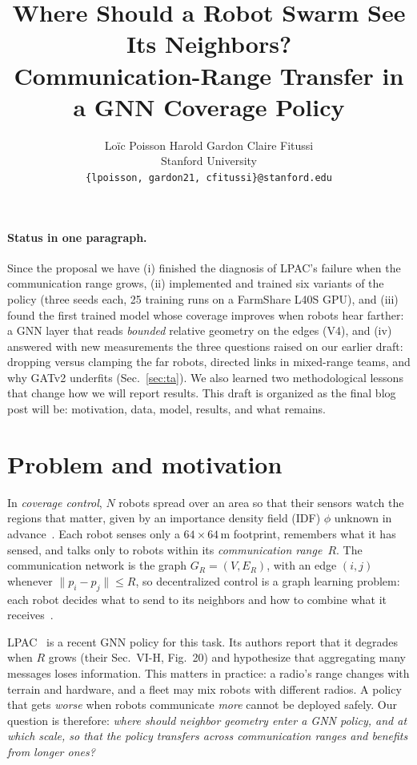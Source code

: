 \documentclass{article}
\title{Where Should a Robot Swarm See Its Neighbors?\\ Communication-Range Transfer in a GNN Coverage Policy}
\author{%
  Lo\"ic Poisson \quad Harold Gardon \quad Claire Fitussi \\
  Stanford University \\
  \texttt{\{lpoisson, gardon21, cfitussi\}@stanford.edu}
}
\begin{document}
\maketitle
\vspace{-1em}

\paragraph{Status in one paragraph.}
Since the proposal we have (i) finished the diagnosis of LPAC's failure when the communication range grows, (ii) implemented and trained six variants of the policy (three seeds each, 25 training runs on a FarmShare L40S GPU), and (iii) found the first trained model whose coverage improves when robots hear farther: a GNN layer that reads \emph{bounded} relative geometry on the edges (V4), and (iv) answered with new measurements the three questions raised on our earlier draft: dropping versus clamping the far robots, directed links in mixed-range teams, and why GATv2 underfits (Sec.~\ref{sec:ta}). We also learned two methodological lessons that change how we will report results. This draft is organized as the final blog post will be: motivation, data, model, results, and what remains.

\section{Problem and motivation}
In \emph{coverage control}, $N$ robots spread over an area so that their sensors watch the regions that matter, given by an importance density field (IDF) $\phi$ unknown in advance~\citep{cortes2004coverage}. Each robot senses only a $64\times64$\,m footprint, remembers what it has sensed, and talks only to robots within its \emph{communication range}~$R$. The communication network is the graph $G_R=(V,E_R)$, with an edge $(i,j)$ whenever $\|p_i-p_j\|\le R$, so decentralized control is a graph learning problem: each robot decides what to send to its neighbors and how to combine what it receives~\citep{tolstaya2019flocking}.

LPAC~\citep{agarwal2025lpac} is a recent GNN policy for this task. Its authors report that it degrades when $R$ grows (their Sec.~VI-H, Fig.~20) and hypothesize that aggregating many messages loses information. This matters in practice: a radio's range changes with terrain and hardware, and a fleet may mix robots with different radios. A policy that gets \emph{worse} when robots communicate \emph{more} cannot be deployed safely. Our question is therefore: \emph{where should neighbor geometry enter a GNN policy, and at which scale, so that the policy transfers across communication ranges and benefits from longer ones?}
\end{document}
